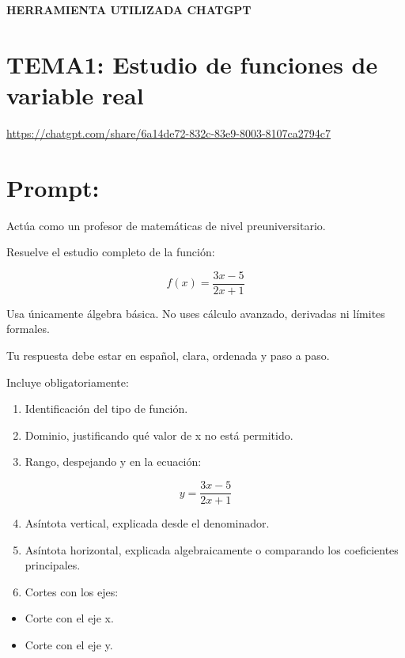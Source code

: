 \documentclass[12pt,a4paper]{article}
\begin{document}
	
	\begin{center}
		\Large \textbf{HERRAMIENTA UTILIZADA CHATGPT}
	\end{center}
	
	\section*{TEMA1: Estudio de funciones de variable real}
	
	\url{https://chatgpt.com/share/6a14de72-832c-83e9-8003-8107ca2794c7}
	
	\section*{Prompt:}
	
	Actúa como un profesor de matemáticas de nivel preuniversitario.
	
	Resuelve el estudio completo de la función:
	
	\[
	f(x)=\frac{3x-5}{2x+1}
	\]
	
	Usa únicamente álgebra básica. No uses cálculo avanzado, derivadas ni límites formales.
	
	Tu respuesta debe estar en español, clara, ordenada y paso a paso.
	
	Incluye obligatoriamente:
	
	\begin{enumerate}
		\item Identificación del tipo de función.
		\item Dominio, justificando qué valor de x no está permitido.
		\item Rango, despejando y en la ecuación:
	\end{enumerate}
	
	\[
	y=\frac{3x-5}{2x+1}
	\]
	
	\begin{enumerate}
		\setcounter{enumi}{3}
		\item Asíntota vertical, explicada desde el denominador.
		\item Asíntota horizontal, explicada algebraicamente o comparando los coeficientes principales.
		\item Cortes con los ejes:
	\end{enumerate}
	
	\begin{itemize}
		\item Corte con el eje x.
		\item Corte con el eje y.
	\end{itemize}
	
\end{document}
